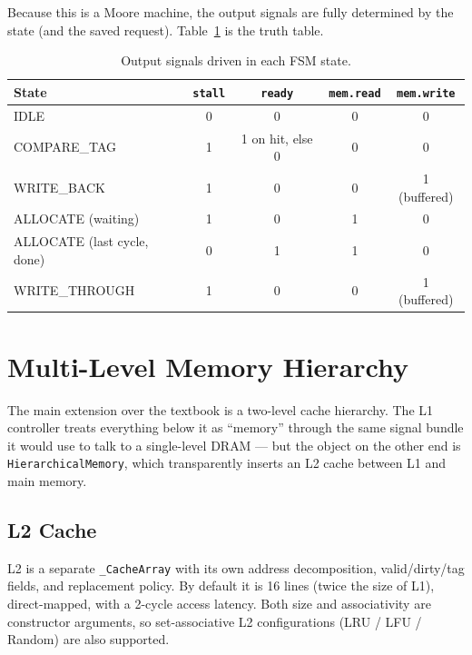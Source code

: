 \documentclass[11pt,a4paper]{article}
\begin{document}
Because this is a Moore machine, the output signals are fully determined by
the state (and the saved request). Table~\ref{tab:truth} is the truth table.

\begin{table}[h]
    \centering
    \caption{Output signals driven in each FSM state.}
    \label{tab:truth}
    \begin{tabular}{@{}lcccc@{}}
        \toprule
        \textbf{State} & \texttt{stall} & \texttt{ready} & \texttt{mem.read} & \texttt{mem.write} \\
        \midrule
        IDLE                           & 0 & 0               & 0 & 0 \\
        COMPARE\_TAG                   & 1 & 1 on hit, else 0& 0 & 0 \\
        WRITE\_BACK                    & 1 & 0               & 0 & 1 (buffered) \\
        ALLOCATE (waiting)             & 1 & 0               & 1 & 0 \\
        ALLOCATE (last cycle, done)    & 0 & 1               & 1 & 0 \\
        WRITE\_THROUGH                 & 1 & 0               & 0 & 1 (buffered) \\
        \bottomrule
    \end{tabular}
\end{table}

\section{Multi-Level Memory Hierarchy}\label{sec:hier}

The main extension over the textbook is a two-level cache hierarchy. The L1
controller treats everything below it as ``memory'' through the same signal
bundle it would use to talk to a single-level DRAM — but the object on the
other end is \texttt{HierarchicalMemory}, which transparently inserts an L2
cache between L1 and main memory.

\subsection{L2 Cache}

L2 is a separate \texttt{\_CacheArray} with its own address decomposition,
valid/dirty/tag fields, and replacement policy. By default it is 16 lines
(twice the size of L1), direct-mapped, with a 2-cycle access latency. Both
size and associativity are constructor arguments, so set-associative L2
configurations (LRU / LFU / Random) are also supported.
\end{document}
